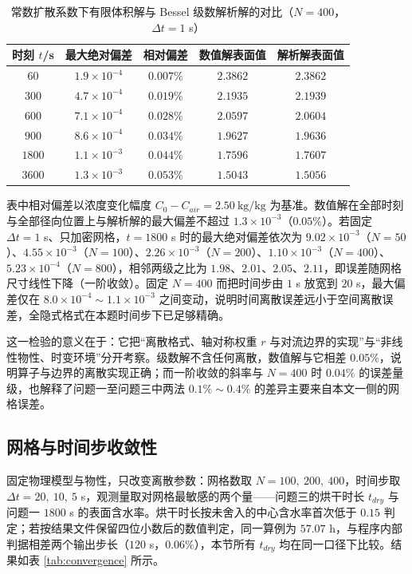 \documentclass[12pt,a4paper]{article}
\begin{document}
\begin{table}[H]
\centering
\caption{常数扩散系数下有限体积解与 Bessel 级数解析解的对比（$N=400$，$\Delta t=1$ s）}
\label{tab:analytic}
\begin{tabular}{ccccc}
\toprule
时刻 $t$/s & 最大绝对偏差 & 相对偏差 & 数值解表面值 & 解析解表面值\\
\midrule
$60$   & $1.9\times10^{-4}$ & $0.007\%$ & $2.3862$ & $2.3862$\\
$300$  & $4.7\times10^{-4}$ & $0.019\%$ & $2.1935$ & $2.1939$\\
$600$  & $7.1\times10^{-4}$ & $0.028\%$ & $2.0597$ & $2.0604$\\
$900$  & $8.6\times10^{-4}$ & $0.034\%$ & $1.9627$ & $1.9636$\\
$1800$ & $1.1\times10^{-3}$ & $0.044\%$ & $1.7596$ & $1.7607$\\
$3600$ & $1.3\times10^{-3}$ & $0.053\%$ & $1.5043$ & $1.5056$\\
\bottomrule
\end{tabular}
\end{table}

表中相对偏差以浓度变化幅度 $C_0-C_{air}=2.50\ \mathrm{kg/kg}$ 为基准。数值解在全部时刻与全部径向位置上与解析解的最大偏差不超过 $1.3\times10^{-3}$（$0.05\%$）。若固定 $\Delta t=1$ s、只加密网格，$t=1800$ s 时的最大绝对偏差依次为 $9.02\times10^{-3}$（$N=50$）、$4.55\times10^{-3}$（$N=100$）、$2.26\times10^{-3}$（$N=200$）、$1.10\times10^{-3}$（$N=400$）、$5.23\times10^{-4}$（$N=800$），相邻两级之比为 $1.98$、$2.01$、$2.05$、$2.11$，即误差随网格尺寸线性下降（一阶收敛）。固定 $N=400$ 而把时间步由 $1$ s 放宽到 $20$ s，最大偏差仅在 $8.0\times10^{-4}\sim1.1\times10^{-3}$ 之间变动，说明时间离散误差远小于空间离散误差，全隐式格式在本题时间步下已足够精确。

这一检验的意义在于：它把“离散格式、轴对称权重 $r$ 与对流边界的实现”与“非线性物性、时变环境”分开考察。级数解不含任何离散，数值解与它相差 $0.05\%$，说明算子与边界的离散实现正确；而一阶收敛的斜率与 $N=400$ 时 $0.04\%$ 的误差量级，也解释了问题一至问题三中两法 $0.1\%\sim0.4\%$ 的差异主要来自本文一侧的网格误差。

\subsection{网格与时间步收敛性}

固定物理模型与物性，只改变离散参数：网格数取 $N=100,\ 200,\ 400$，时间步取 $\Delta t=20,\ 10,\ 5$ s，观测量取对网格最敏感的两个量——问题三的烘干时长 $t_{dry}$ 与问题一 $1800$ s 的表面含水率。烘干时长按未舍入的中心含水率首次低于 $0.15$ 判定；若按结果文件保留四位小数后的数值判定，同一算例为 $57.07$ h，与程序内部判据相差两个输出步长（$120$ s，$0.06\%$），本节所有 $t_{dry}$ 均在同一口径下比较。结果如表 \ref{tab:convergence} 所示。
\end{document}
